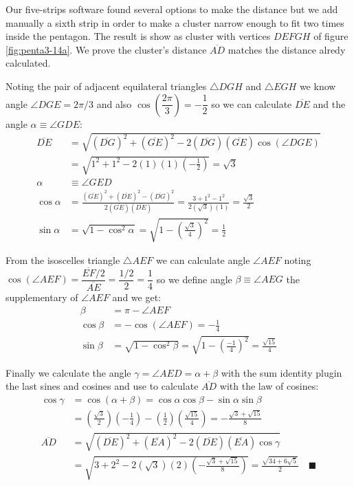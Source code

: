 \documentclass[11pt]{article}
\begin{document}
Our five-strips software found several options to make the distance but we add manually a sixth strip in order to make a cluster narrow enough to fit two times inside the pentagon. The result is show as cluster with vertices $DEFGH$ of figure \ref{fig:penta3-14a}. We prove the cluster's distance $\overline{AD}$ matches the distance alredy calculated.

Noting the pair of adjacent equilateral triangles $\triangle{DGH}$ and $\triangle{EGH}$ we know angle $\angle{DGE} = 2\pi / 3$ and also $\cos\left(\dfrac{2\pi}3\right) = -\dfrac{1}2$ so we can calculate $\overline{DE}$ and the angle $\alpha \equiv \angle{GDE}$:
\begin{align}
\overline{DE} &= \sqrt{(\overline{DG})^2 + (\overline{GE})^2 
 - 2(\overline{DG})(\overline{GE})\cos(\angle{DGE})} \nonumber\\
 &= \sqrt{1^2 + 1^2 - 2(1)(1)\left(-\frac{1}2\right)} = \sqrt3\\
\alpha &\equiv \angle{GED} \nonumber\\
\cos\alpha &= \frac{(\overline{GE})^2 + (\overline{DE})^2 - (\overline{DG})^2}
 {2(\overline{GE})(\overline{DE})}
 = \frac{3 + 1^2 - 1^2}{2(\sqrt3)(1)} = \frac{\sqrt3}2\\
\sin\alpha &= \sqrt{1 - \cos^2\alpha} = \sqrt{1 - \left(\frac{\sqrt3}4\right)^2} 
 = \frac{1}2
\end{align}

From the isoscelles triangle $\triangle{AEF}$ we can calculate angle $\angle{AEF}$ noting $\cos(\angle{AEF}) = \dfrac{\overline{EF}/2}{\overline{AE}} = \dfrac{1/2}{2} = \dfrac{1}4$ so we define angle $\beta \equiv \angle{AEG}$ the supplementary of $\angle{AEF}$ and we get:
\begin{align}
\beta &= \pi - \angle{AEF} \nonumber\\
\cos\beta &= -\cos(\angle{AEF}) = -\frac{1}4 \\
\sin\beta &= \sqrt{1 - \cos^2\beta} = \sqrt{1 - \left(\frac{-1}4\right)^2} = \frac{\sqrt{15}}4
\end{align}

Finally we calculate the angle $\gamma = \angle{AED} = \alpha + \beta$ with the sum identity  plugin the last sines and cosines and use to calculate $\overline{AD}$ with the law of cosines:
\begin{align}
\cos\gamma &= \cos(\alpha + \beta) = \cos\alpha\cos\beta - \sin\alpha\sin\beta \nonumber\\
 & = \left(\frac{\sqrt3}2\right)\left(-\frac{1}4\right) 
  - \left(\frac{1}2\right)\left(\frac{\sqrt{15}}4\right) 
  = -\frac{\sqrt3 + \sqrt{15}}8 \\
\overline{AD} &= \sqrt{(\overline{DE})^2 + (\overline{EA})^2 
 - 2(\overline{DE})(\overline{EA})\cos\gamma} \nonumber\\
 &= \sqrt{3 + 2^2 - 2(\sqrt3)(2)\left(-\frac{\sqrt3 + \sqrt{15}}8\right)} 
 = \frac{\sqrt{34 + 6\sqrt5}}2 \quad\blacksquare
\end{align}
\end{document}
